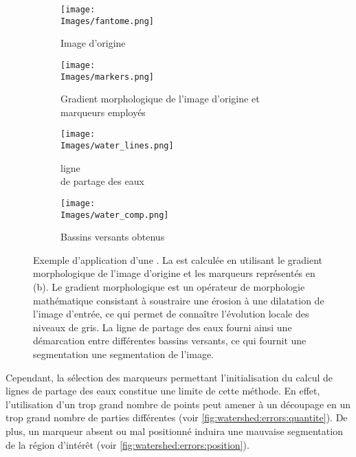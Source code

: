 \documentclass[\main/main.tex]{subfiles}
\providecommand{\Images}{\main/Figures/intro_seg}
\begin{document}
\begin{figure}[h!]
    \begin{subfigure}[b]{0.50\textwidth}
       \caption{
           \label{fig:lpe:marqueurs}
            Image d'origine
            }
       \centering \texttt{[image: \\Images/fantome.png]}
    \end{subfigure}
    \begin{subfigure}[b]{0.5\textwidth}
       \caption{
           \label{fig:lpe:marqueurs}
           Gradient morphologique de l'image d'origine et marqueurs employés
            }
       \centering \texttt{[image: \\Images/markers.png]}
    \end{subfigure}
    \begin{subfigure}[b]{0.5\textwidth}
       \caption{
           \label{fig:lpe:lines}
           ligne\\ de partage des eaux
            }
       \centering \texttt{[image: \\Images/water\_lines.png]}
    \end{subfigure}
    \begin{subfigure}[b]{0.5\textwidth}
       \caption{
           \label{fig:lpe:zones}
            Bassins versants obtenus
            }
       \centering \texttt{[image: \\Images/water\_comp.png]}
    \end{subfigure}
    \caption{
        Exemple d'application d'une \watershed{}.\newline
        La \watershed{} est calculée en utilisant le gradient morphologique de l'image d'origine et les marqueurs représentés en (b).
        Le gradient morphologique est un opérateur de morphologie mathématique consistant à soustraire une érosion à une dilatation de l'image d'entrée, ce qui permet de connaître l'évolution locale des niveaux de gris.
        La ligne de partage des eaux fourni ainsi une démarcation entre différentes bassins versants, ce qui fournit une segmentation une segmentation de l'image.
    }
    
\end{figure}

%
%
Cependant, la sélection des marqueurs permettant l'initialisation du calcul de lignes de partage des eaux constitue une limite de cette méthode.
%
En effet, l'utilisation d'un trop grand nombre de points peut amener à un découpage en un trop grand nombre de parties différentes (voir \autoref{fig:watershed:errors:quantite}).
%
De plus, un marqueur absent ou mal positionné induira une mauvaise segmentation de la région d'intérêt (voir \autoref{fig:watershed:errors:position}).
\end{document}
